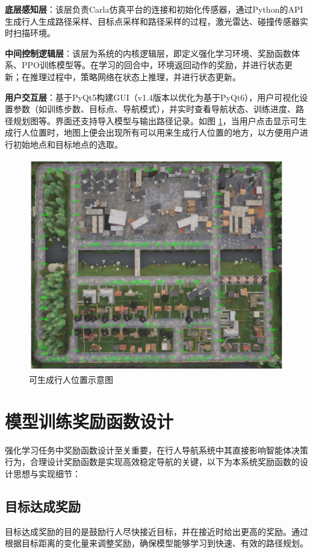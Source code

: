 \textbf{底层感知层}：该层负责Carla仿真平台的连接和初始化传感器，通过Python的API生成行人生成路径采样、目标点采样和路径采样的过程，激光雷达、碰撞传感器实时扫描环境。

\textbf{中间控制逻辑层}：该层为系统的内核逻辑层，即定义强化学习环境、奖励函数体系、PPO训练模型等。在学习的回合中，环境返回动作的奖励，并进行状态更新；在推理过程中，策略网络在状态上推理，并进行状态更新。

\textbf{用户交互层}：基于PyQt5构建GUI（v1.4版本以优化为基于PyQt6），用户可视化设置参数（如训练步数、目标点、导航模式），并实时查看导航状态、训练进度、路径规划图等。界面还支持导入模型与输出路径记录。如图 \ref{fig:location}，当用户点击显示可生成行人位置时，地图上便会出现所有可以用来生成行人位置的地方，以方便用户进行初始地点和目标地点的选取。

\begin{figure}[H]
	\centering
	\includegraphics[width=1\textwidth]{images/location_point.pdf}
	\caption{可生成行人位置示意图}
	\label{fig:location}
\end{figure}
	
\section{模型训练奖励函数设计}
	
强化学习任务中奖励函数设计至关重要，在行人导航系统中其直接影响智能体决策行为，合理设计奖励函数是实现高效稳定导航的关键，以下为本系统奖励函数的设计思想与实现细节：
	
\subsection{目标达成奖励}
目标达成奖励的目的是鼓励行人尽快接近目标，并在接近时给出更高的奖励。通过根据目标距离的变化量来调整奖励，确保模型能够学习到快速、有效的路径规划。
	

